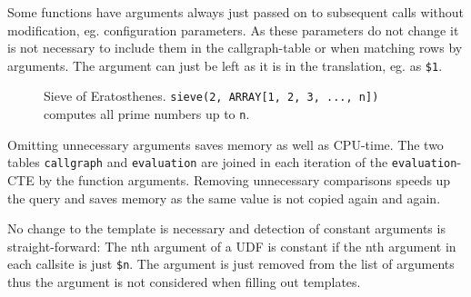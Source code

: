 Some functions have arguments always just passed on to subsequent calls without modification, eg. configuration parameters. As these parameters do not change it is not necessary to include them in the callgraph-table or when matching rows by arguments. The argument can just be left as it is in the translation, eg. as \texttt{\$1}.

\begin{wrapfigure}{r}{0.66\textwidth}
  \vspace{-10pt}
  \caption{Sieve of Eratosthenes. \texttt{sieve(2, ARRAY[1, 2, 3, ..., n])} computes all prime numbers up to \texttt{n}.}
  \label{lst:sieve_udf}
\end{wrapfigure}

Omitting unnecessary arguments saves memory as well as CPU-time. The two tables \texttt{callgraph} and \texttt{evaluation} are joined in each iteration of the \texttt{evaluation}-CTE by the function arguments. Removing unnecessary comparisons speeds up the query and saves memory as the same value is not copied again and again.

No change to the template is necessary and detection of constant arguments is straight-forward: The nth argument of a UDF is constant if the nth argument in each callsite is just \texttt{\$n}. The argument is just removed from the list of arguments thus the argument is not considered when filling out templates.

